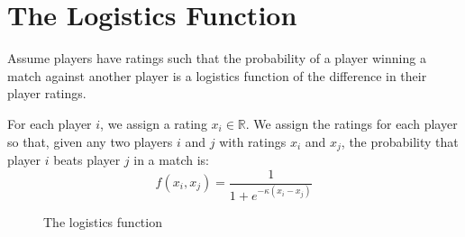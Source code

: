 \documentclass{article}
\begin{document}
\section{The Logistics Function}
Assume players have ratings such that the probability of a player winning a
match against another player is a logistics function of the difference in
their player ratings.

For each player $i$, we assign a rating $x_i \in \mathbb{R}$. We assign the
ratings for each player so that, given any two players $i$ and $j$ with
ratings $x_i$ and $x_j$, the probability that player $i$ beats player $j$ in a
match is:
\begin{equation}
  f(x_i, x_j) = \frac{1}{1 + e^{-\kappa(x_i - x_j)}}
\end{equation}

\begin{figure}
  \caption{The logistics function}
  \label{fig:logistics}
 \end{figure}
\end{document}
